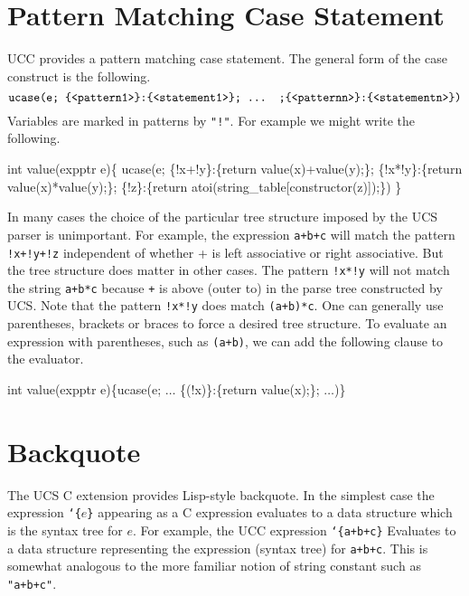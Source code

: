 \documentclass{article}
\newcommand{\mtt}[1]{\mbox{\tt #1}}
\begin{document}
\section{Pattern Matching Case Statement}

UCC provides a pattern matching case statement.
The general form of the case construct is the following.
$$\mtt{ucase(e; \{<pattern1>\}:\{<statement1>\}; ... ;\{<patternn>\}:\{<statementn>\})}$$
Variables are marked in patterns by \mtt{"!"}. For example we might write the following.

\begin{code}
int value(expptr e)\{
  ucase(e;
   \{!x+!y\}:\{return value(x)+value(y);\};
   \{!x*!y\}:\{return value(x)*value(y);\};
   \{!z\}:\{return atoi(string\_table[constructor(z)]);\})
\}
\end{code}

In many cases the choice of the particular tree structure imposed by the UCS parser is unimportant.  For example, the expression \mtt{a+b+c} will match the pattern
\mtt{!x+!y+!z} independent of whether + is left associative or right associative.  But the tree structure does matter in other cases.  The pattern \mtt{!x*!y}
will not match the string \mtt{a+b*c} because \mtt{+} is above (outer to) \mtt{*} in the parse tree constructed by UCS. Note that the pattern \mtt{!x*!y} does match \mtt{(a+b)*c}.
One can generally use parentheses, brackets or braces to force a desired tree structure.
To evaluate an expression with parentheses, such as \mtt{(a+b)}, we can add the following clause to the evaluator.

\begin{code}
int value(expptr e)\{ucase(e; $\ldots$ \{(!x)\}:\{return value(x);\}; $\ldots$)\}
\end{code}

\section{Backquote}

The UCS C extension provides Lisp-style backquote.
In the simplest case the expression \mtt{`\{$e$\}} appearing as a C expression evaluates to a data structure which is the syntax tree for
$e$.  For example, the UCC expression \mtt{`\{a+b+c\}}
Evaluates to a data structure representing the expression (syntax tree) for \mtt{a+b+c}.  This is somewhat analogous to the more familiar
notion of string constant such as \mtt{"a+b+c"}.
\end{document}
